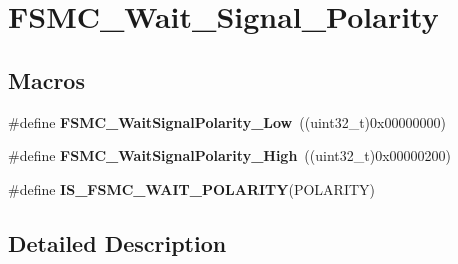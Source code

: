 \hypertarget{group___f_s_m_c___wait___signal___polarity}{\section{F\-S\-M\-C\-\_\-\-Wait\-\_\-\-Signal\-\_\-\-Polarity}
\label{group___f_s_m_c___wait___signal___polarity}
}
\subsection*{Macros}
\begin{DoxyCompactItemize}
\item 
\hypertarget{group___f_s_m_c___wait___signal___polarity_ga7dc72fdfc6225e5daa9b8efee8dff49f}{\#define {\bfseries F\-S\-M\-C\-\_\-\-Wait\-Signal\-Polarity\-\_\-\-Low}~((uint32\-\_\-t)0x00000000)}\label{group___f_s_m_c___wait___signal___polarity_ga7dc72fdfc6225e5daa9b8efee8dff49f}

\item 
\hypertarget{group___f_s_m_c___wait___signal___polarity_ga3418f29249a261edb1359d1bcdc43661}{\#define {\bfseries F\-S\-M\-C\-\_\-\-Wait\-Signal\-Polarity\-\_\-\-High}~((uint32\-\_\-t)0x00000200)}\label{group___f_s_m_c___wait___signal___polarity_ga3418f29249a261edb1359d1bcdc43661}

\item 
\#define {\bfseries I\-S\-\_\-\-F\-S\-M\-C\-\_\-\-W\-A\-I\-T\-\_\-\-P\-O\-L\-A\-R\-I\-T\-Y}(P\-O\-L\-A\-R\-I\-T\-Y)
\end{DoxyCompactItemize}


\subsection{Detailed Description}


